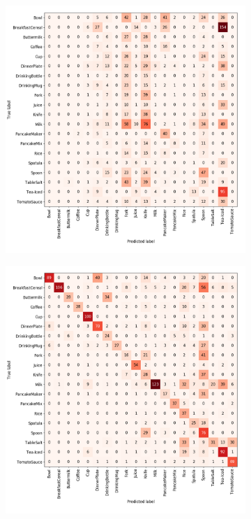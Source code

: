\begin{figure}
\begin{subfigure}[b]{0.48\textwidth}
	\end{subfigure}
	\begin{subfigure}[b]{0.48\textwidth}
		\includegraphics[scale=.27]{img/chapter6/UnrealGTClass_size.png}	
	\end{subfigure}
	\begin{subfigure}[b]{0.48\textwidth}
		\includegraphics[scale=.27]{img/chapter6/UnrealGTClass_instance.png}	

\end{subfigure}
\end{figure}
